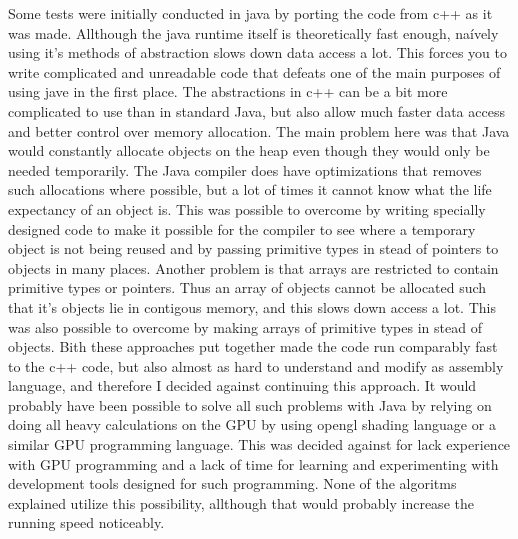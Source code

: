 \documentclass[a4paper,12pt]{report}
\begin{document}
Some tests were initially conducted in java by porting the code from c++ as it was made. Allthough the java runtime itself is theoretically fast enough, naívely using it's methods of abstraction slows down data access a lot. This forces you to write complicated and unreadable code that defeats one of the main purposes of using jave in the first place. The abstractions in c++ can be a bit more complicated to use than in standard Java, but also allow much faster data access and better control over memory allocation. The main problem here was that Java would constantly allocate objects on the heap even though they would only be needed temporarily. The Java compiler does have optimizations that removes such allocations where possible, but a lot of times it cannot know what the life expectancy of an object is. This was possible to overcome by writing specially designed code to make it possible for the compiler to see where a temporary object is not being reused and by passing primitive types in stead of pointers 
to objects in many places. Another problem is that arrays are restricted to contain primitive types or pointers. Thus an array of objects cannot be allocated such that it's objects lie in contigous memory, and this slows down access a lot. This was also possible to overcome by making arrays of primitive types in stead of objects. Bith these approaches put together made the code run comparably fast to the c++ code, but also almost as hard to understand and modify as assembly language, and therefore I decided against continuing this approach. It would probably have been possible to solve all such problems with Java by relying on doing all heavy calculations on the GPU by using opengl shading language or a similar GPU programming language. This was decided against for lack experience with GPU programming and a lack of time for learning and experimenting with development tools designed for such programming. None of the algoritms explained utilize this possibility, allthough that would probably increase the 
running speed noticeably.
\end{document}
